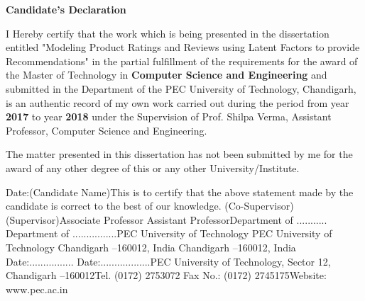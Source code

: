 \documentclass{article}
\begin{document}
\justify
\begin{center}
\textbf{Candidate's Declaration}
\end{center}
I Hereby  certify  that  the  work  which  is  being  presented  in  the dissertation entitled "Modeling Product Ratings and Reviews using Latent Factors to provide Recommendations" in  the partial fulfillment of the requirements for the award of the Master of Technology in \textbf{Computer Science and Engineering} and submitted in the Department of the PEC University of Technology, Chandigarh, is  an  authentic record of my own work carried out during the period from year \textbf{2017} to year \textbf{2018} under the Supervision of Prof. Shilpa Verma, Assistant Professor, Computer Science and Engineering. 

The  matter  presented  in  this dissertation has  not  been  submitted  by  me  for  the  award  of  any other degree of this or any other University/Institute.

Date:(Candidate Name)This  is  to  certify  that  the  above  statement  made  by  the  candidate  is  correct  to  the  best  of  our knowledge. (Co-Supervisor)(Supervisor)Associate Professor                                                         Assistant ProfessorDepartment of ...........                   Department of ................PEC University of Technology                                        PEC University of Technology                                                        Chandigarh –160012, India                                            Chandigarh –160012, India                                                                                                   Date:................                                                           Date:..................PEC University of Technology, Sector 12, Chandigarh –160012Tel. (0172) 2753072 Fax No.: (0172) 2745175Website: www.pec.ac.in
\end{document}
